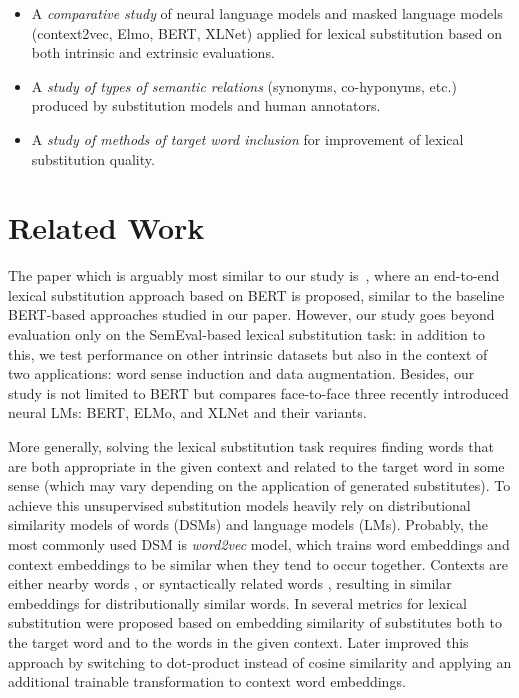 \documentclass[11pt,a4paper]{article}
\newenvironment{itemize2}
    {\begin{itemize}
        \vspace{-0.3em}
        \setlength{\abovedisplayskip}{0pt}
        \setlength{\belowdisplayskip}{0pt}
        \setlength{\itemsep}{5pt}
        \setlength{\parskip}{0pt}
        \setlength{\parsep}{0pt}
        \setlength{\topsep}{0pt}
        \setlength{\partopsep}{0pt}
    }
    {\vspace{-0.3em}
    \end{itemize}}
\begin{document}
\begin{itemize2}
\item A \textit{comparative study} of neural language models and masked language models (context2vec, Elmo, BERT, XLNet) applied for lexical substitution based on both intrinsic and extrinsic evaluations. 
\item A \textit{study of types of semantic relations} (synonyms, co-hyponyms, etc.) produced by substitution models and human annotators. 
\item A \textit{study of methods of target word inclusion} for improvement of lexical substitution quality. 
\end{itemize2}


\section{Related Work}
\label{sec:rel_work}

The paper which is arguably most similar to our study is~\cite{zhou-etal-2019-bert}, where an end-to-end lexical substitution approach based on BERT is proposed, similar to the baseline BERT-based approaches studied in our paper. However, our study goes beyond evaluation only on the SemEval-based lexical substitution task: in addition to this, we test performance on other intrinsic datasets but also in the context of two applications: word sense induction and data augmentation. Besides, our study is not limited to BERT but compares face-to-face three recently introduced neural LMs: BERT, ELMo, and XLNet and their variants. 

More generally, solving the lexical substitution task requires finding words that are both appropriate in the given context and related to the target word in some sense (which may vary depending on the application of generated substitutes). To achieve this unsupervised substitution models heavily rely on distributional similarity models of words (DSMs) and language models (LMs). Probably, the most commonly used DSM is \textit{word2vec} model, which trains word embeddings and context embeddings to be similar when they tend to occur together. Contexts are either nearby words \cite{word2vec}, or syntactically related words \cite{levy-goldberg-2014-dependency}, resulting in similar embeddings for distributionally similar words. In \cite{melamud-etal-2015-simple} several metrics for lexical substitution were proposed based on embedding similarity of substitutes both to the target word and to the words in the given context. Later \cite{pic} improved this approach by switching to dot-product instead of cosine similarity and applying an additional trainable transformation to context word embeddings. 
\end{document}
